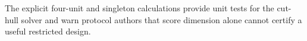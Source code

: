 The explicit four-unit and singleton calculations provide unit tests for the cut-hull solver and warn protocol authors that score dimension alone cannot certify a useful restricted design.